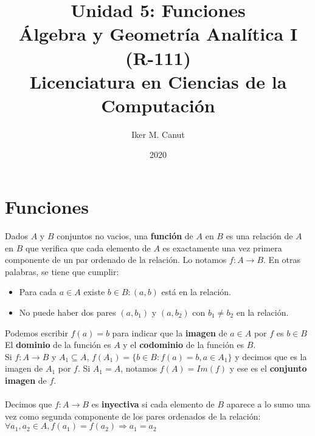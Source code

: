 \documentclass[11pt,a4paper]{article}
\author{Iker M. Canut}
\title{Unidad 5: Funciones\\\'Algebra y Geometr\'ia Anal\'itica I (R-111)\\Licenciatura en Ciencias de la Computaci\'on}
\date{2020}
\begin{document}
\maketitle
\newpage

\section{Funciones}
\noindent Dados $A$ y $B$ conjuntos no vacios, una \textbf{funci\'on} de $A$ en $B$ es una relaci\'on de $A$ en $B$ que verifica que cada elemento de $A$ es exactamente una vez primera componente de un par ordenado de la relaci\'on. Lo notamos $f : A \rightarrow B$. En otras palabras, se tiene que cumplir:
\begin{itemize}
\item Para cada $a \in A$ existe $b \in B : (a,b)$ est\'a en la relaci\'on.
\item No puede haber dos pares $(a, b_1)$ y $(a,b_2)$ con $b_1 \not = b_2$ en la relaci\'on.
\end{itemize}
\noindent Podemos escribir $f(a) = b$ para indicar que la \textbf{imagen} de $a\in A$ por $f$ es $b\in B$\\
\noindent El \textbf{dominio} de la funci\'on es $A$ y el \textbf{codominio} de la funci\'on es $B$.\\
\noindent Si $f : A \rightarrow B$ y $A_1 \subseteq A$,
$f(A_1) = \{ b \in B : f(a) = b, a \in A_1 \}$
y decimos que es la imagen de $A_1$ por $f$. Si $A_1 = A$, notamos $f(A) = Im(f)$ y ese es el \textbf{conjunto imagen} de $f$.\\ \\


\noindent Decimos que $f : A \rightarrow B$ es \textbf{inyectiva} si cada elemento de $B$ aparece a lo sumo una vez como segunda componente de los pares ordenados de la relaci\'on: $\forall a_1, a_2 \in A, f(a_1) = f(a_2) \Rightarrow a_1 = a_2$\\
\end{document}
